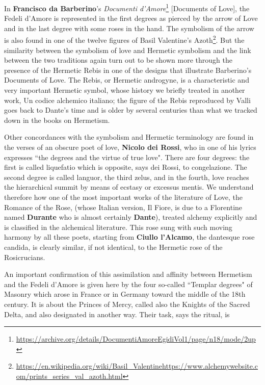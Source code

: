 In \textbf{Francisco da Barberino}'s \textit{Documenti d'Amore}\footnote{\url{https://archive.org/details/DocumentiAmoreEgidiVol1/page/n18/mode/2up}} [Documents of Love], the Fedeli d'Amore is represented in the first degrees as pierced by the arrow of Love and in the last degree with some roses in the hand. The symbolism of the arrow is also found in one of the twelve figures of Basil Valentine's Azoth\footnote{\url{https://en.wikipedia.org/wiki/Basil_Valentine}\newline\url{https://www.alchemywebsite.com/prints_series_val_azoth.html}}. But the similarity between the symbolism of love and Hermetic symbolism and the link between the two traditions again turn out to be shown more through the presence of the Hermetic Rebis in one of the designs that illustrate Barberino's Documents of Love. The Rebis, or Hermetic androgyne, is a characteristic and very important Hermetic symbol, whose history we briefly treated in another work, Un codice alchemico italiano; the figure of the Rebis reproduced by Valli goes back to Dante's time and is older by several centuries than what we tracked down in the books on Hermetism.

Other concordances with the symbolism and Hermetic terminology are found in the verses of an obscure poet of love, \textbf{Nicolo dei Rossi}, who in one of his lyrics expresses ``the degrees and the virtue of true love". There are four degrees: the first is called liquefatio which is opposite, says dei Rossi, to congelazione. The second degree is called languor, the third zelus, and in the fourth, love reaches the hierarchical summit by means of ecstasy or excessus mentis. We understand therefore how one of the most important works of the literature of Love, the Romance of the Rose, (whose Italian version, Il Fiore, is due to a Florentine named \textbf{Durante} who is almost certainly \textbf{Dante}), treated alchemy explicitly and is classified in the alchemical literature. This rose sung with such moving harmony by all these poets, starting from \textbf{Ciullo l'Alcamo}, the dantesque rose candida, is clearly similar, if not identical, to the Hermetic rose of the Rosicrucians.

An important confirmation of this assimilation and affinity between Hermetism and the Fedeli d'Amore is given here by the four so-called ``Templar degrees" of Masonry which arose in France or in Germany toward the middle of the 18th century. It is about the Princes of Mercy, called also the Knights of the Sacred Delta, and also designated in another way. Their task, says the ritual, is

